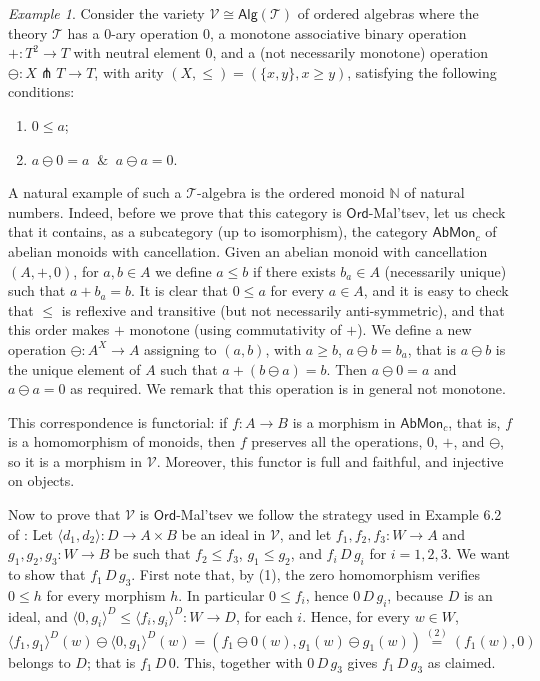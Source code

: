 \documentclass[11pt]{amsart}
\theoremstyle{plain}
\theoremstyle{definition}
\theoremstyle{remark}
\newtheorem{example}[subsection]{Example}
\newcommand{\V}{\ensuremath{\mathcal{V}}}
\newcommand{\Ord}{\ensuremath{\mathsf{Ord}}}
\newcommand{\Ab}{\ensuremath{\mathsf{Ab}}}
\newcommand{\Mon}{\ensuremath{\mathsf{Mon}}}
\newcommand{\N}{\ensuremath{\mathbb{N}}}
\newcommand{\la}{\langle}
\newcommand{\ra}{\rangle}
\newcommand{\T}{\ensuremath{\mathcal{T}}}
\newcommand{\Alg}[1]{\ensuremath{\mathsf{Alg}(#1)}}
\begin{document}
\begin{example}
Consider the variety $\V\cong \Alg{\T}$ of ordered algebras where the theory $\T$ has a 0-ary operation $0$, a monotone associative binary operation $+\colon T^2\to T$ with neutral element 0, and a (not necessarily monotone) operation $\ominus\colon X\pitchfork T \to T$, with arity $(X,\le)=(\{x,y\}, x\ge y)$, satisfying the following conditions:
\begin{enumerate}
	\item $0\leq a$;
	\item $a\ominus 0=a\;\;\&\;\;a\ominus a=0$.
\end{enumerate}
A natural example of such a $\T$-algebra is the ordered monoid $\N$ of natural numbers. Indeed, before we prove that this category is $\Ord$-Mal'tsev, let us check that it contains, as a subcategory (up to isomorphism), the category $\Ab\Mon_c$ of abelian monoids with cancellation. Given an abelian monoid with cancellation $(A,+,0)$, for $a,b\in A$ we define $a\le b$ if there exists $b_a\in A$ (necessarily unique) such that $a+b_a=b$. It is clear that $0\leq a$ for every $a\in A$, and it is easy to check that $\leq$ is reflexive and transitive (but not necessarily anti-symmetric), and that this order makes $+$ monotone (using commutativity of $+$). We define a new operation $\ominus\colon A^X\to A$ assigning to $(a,b)$, with $a\ge b$, $a\ominus b=b_a$, that is $a\ominus b$ is the unique element of $A$ such that $a+(b\ominus a)=b$. Then $a\ominus 0=a$ and $a\ominus a=0$ as required. We remark that this operation is in general not monotone.

This correspondence is functorial: if $f\colon A\to B$ is a morphism in $\Ab\Mon_c$, that is, $f$ is a homomorphism of monoids, then $f$ preserves all the operations, $0$, $+$, and $\ominus$, so it is a morphism in $\V$. Moreover, this functor is full and faithful, and injective on objects.

Now to prove that $\V$ is $\Ord$-Mal'tsev we follow the strategy used in Example 6.2 of \cite{CR}:
Let $\la d_1,d_2 \ra\colon D\to A\times B$ be an ideal in $\V$, and let $f_1,f_2,f_3\colon W\to A$ and $g_1,g_2,g_3\colon W\to B$ be such that $f_2\le f_3$, $g_1\le g_2$, and $f_i\,D\,g_i$ for $i=1,2,3$. We want to show that $f_1\,D\,g_3$. First note that, by (1), the zero homomorphism verifies $0\le h$ for every morphism $h$. In particular $0\le f_i$, hence $0\,D\,g_i$, because $D$ is an ideal, and $\langle 0,g_i\rangle^D\leq \langle f_i,g_i\rangle^D\colon W\to D$, for each $i$. Hence, for every $w\in W$,
\[\langle f_1,g_1\rangle^D(w)\ominus \la 0,g_1\rangle^D(w)=(f_1\ominus 0(w),g_1(w)\ominus g_1(w))\stackrel{(2)}{=}(f_1(w),0)\]
belongs to $D$; that is $f_1\,D\,0$. This, together with $0\,D\,g_3$ gives $f_1\,D\,g_3$ as claimed.

\end{example}
\end{document}
